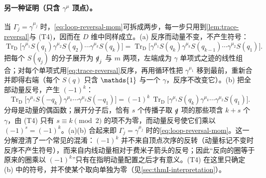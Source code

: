 \documentclass[UTF8,a4paper,11pt,fontset=fandol]{ctexart}
\let\amsmathbb\mathbb
\renewcommand{\mathbb}[1]{\ifx1#1\mathds{1}\else\amsmathbb{#1}\fi}
\theoremstyle{cplain}
\theoremstyle{cdefinition}
\theoremstyle{cremark}
\numberwithin{equation}{section}
\newcommand{\TrD}{\operatorname{Tr}_{\mathrm{D}}}   %
\newcommand{\sla}[1]{\slashed{#1}}                  %
\begin{document}
\paragraph{另一种证明（只含 $\gamma^\mu$ 顶点）。}当 $\Gamma_j=\gamma^{\mu_j}$ 时，\cref{eq:loop-reversal-mom}可拆成两步，每一步只用到\cref{lem:trace-reversal}与 (T4)，因而在 $D$ 维中同样成立。(a) 反序而动量不变，不产生符号：
\begin{equation}\label{eq:dirac-reversion}
\TrD\bigl[\gamma^{\mu_1}S(q_1)\gamma^{\mu_2}S(q_2)\cdots\gamma^{\mu_k}S(q_k)\bigr]=\TrD\bigl[\gamma^{\mu_1}S(q_k)\gamma^{\mu_k}S(q_{k-1})\cdots\gamma^{\mu_2}S(q_1)\bigr].
\end{equation}
把每个 $S(q_j)$ 的分子展开为 $\sla q_j$ 与 $m$ 两项，左端成为 $\gamma$ 单项式之迹的线性组合；对每个单项式用\cref{eq:trace-reversal}反序，再用循环性把 $\gamma^{\mu_1}$ 移到最前，重新合并即得右端（每个 $S(q)$ 只含 $\mathbb 1$ 与一个 $\gamma$，反序不改变它）。(b) 把全部动量反号，产生 $(-1)^k$：
\begin{equation}\label{eq:dirac-momflip}
\TrD\bigl[\gamma^{\mu_1}S(-q_k)\gamma^{\mu_k}\cdots\gamma^{\mu_2}S(-q_1)\bigr]=(-1)^k\,\TrD\bigl[\gamma^{\mu_1}S(q_k)\gamma^{\mu_k}\cdots\gamma^{\mu_2}S(q_1)\bigr].
\end{equation}
分母是动量的偶函数；展开分子后，恰有 $s$ 个传播子取 $\sla q$ 项的那些项含 $k+s$ 个 $\gamma$，由 (T4) 只有 $s\equiv k\pmod 2$ 的项不为零，而动量反号使它们乘以 $(-1)^s=(-1)^k$。(a)(b) 合起来即 $\Gamma_j=\gamma^{\mu_j}$ 时的\cref{eq:loop-reversal-mom}。这一分解澄清了一个常见的混淆：$(-1)^k$ 并不来自顶点次序的反转（动量标记不变时反序不产生符号），而来自内线动量相对于费米子箭头的反号；因此“反向的圈等于原来的圈乘以 $(-1)^k$”只有在指明动量配置之后才有意义。(T4) 在这里只确定 (b) 中的符号，并不使某个取向单独为零（见\cref{sec:thmI-interpretation}）。
\end{document}
